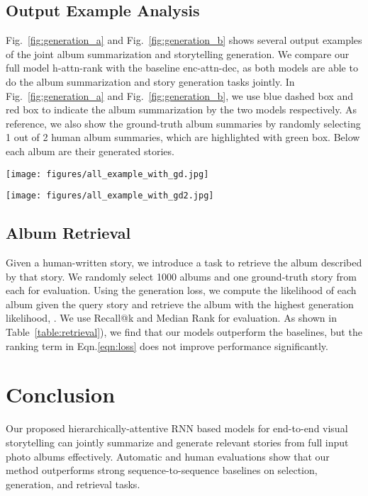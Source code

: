 \vspace{-0.2cm}
\subsection{Output Example Analysis}
Fig.~\ref{fig:generation_a} and Fig.~\ref{fig:generation_b} shows several output examples of the joint album summarization and storytelling generation.
We compare our full model h-attn-rank with the baseline enc-attn-dec, as both models are able to do the album summarization and story generation tasks jointly.
In Fig.~\ref{fig:generation_a} and Fig.~\ref{fig:generation_b}, we use blue dashed box and red box to indicate the album summarization by the two models respectively.
As reference, we also show the ground-truth album summaries by randomly selecting 1 out of 2 human album summaries, which are highlighted with green box.
Below each album are their generated stories.

\begin{figure*}[t!]
\centering
\texttt{[image: figures/all\_example\_with\_gd.jpg]}
\caption{Examples of album summarization and storytelling by enc-attn-dec (blue), h-attn-rank (red), and ground-truth (green). We randomly select 1 out of 2 human album summaries as ground-truth here.}
\label{fig:generation_a}
\end{figure*}

\begin{figure*}[t!]
\centering
\texttt{[image: figures/all\_example\_with\_gd2.jpg]}
\caption{More examples of album summarization and storytelling by enc-attn-dec (blue), h-attn-rank (red), and ground-truth (green). We randomly select 1 out of 2 human album summaries as ground-truth here.}
\label{fig:generation_b}
\end{figure*}


\subsection{Album Retrieval}
Given a human-written story, we introduce a task to retrieve the album described by that story. 
We randomly select 1000 albums and one ground-truth story from each for evaluation. 
Using the generation loss, we compute the likelihood of each album  given the query story  and retrieve the album with the highest generation likelihood, .
We use Recall@k and Median Rank for evaluation.
As shown in Table~\ref{table:retrieval}), we find that our models outperform the baselines, but the ranking term in Eqn.\ref{eqn:loss} does not improve performance significantly.

\section{Conclusion}
\vspace{-0.3cm}
Our proposed hierarchically-attentive RNN based models for end-to-end visual storytelling can jointly summarize and generate relevant stories from full input photo albums effectively. Automatic and human evaluations show that our method outperforms strong sequence-to-sequence baselines on selection, generation, and retrieval tasks.

